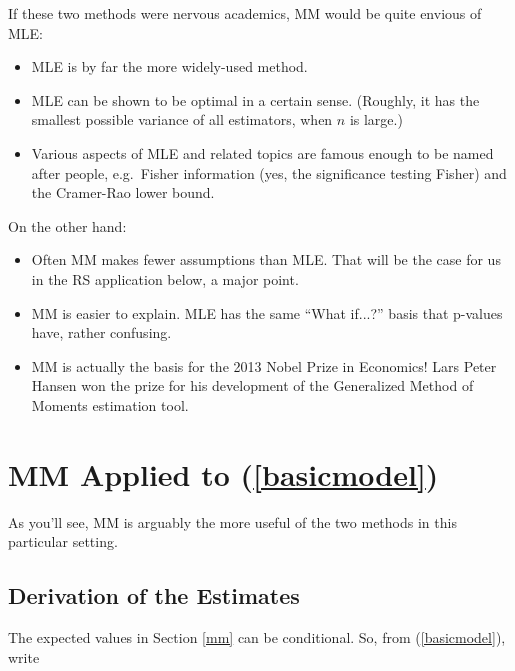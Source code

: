 If these two methods were nervous academics, MM would be quite envious
of MLE:

\begin{itemize}

\item MLE is by far the more widely-used method.

\item MLE can be shown to be optimal in a certain sense.  (Roughly, it
has the smallest possible variance of all estimators, when $n$ is
large.)

\item Various aspects of MLE and related topics are famous enough to be
named after people, e.g.\ Fisher information (yes, the significance
testing Fisher) and the Cramer-Rao lower bound.

\end{itemize} 

On the other hand:

\begin{itemize}

\item Often MM makes fewer assumptions than MLE.  That will be the case
for us in the RS application below, a major point.  

\item MM is easier to explain.  MLE has the same ``What if...?'' basis
that p-values have, rather confusing.

\item MM is actually the basis for the 2013 Nobel Prize in Economics!
Lars Peter Hansen won the prize for his development of the Generalized
Method of Moments estimation tool.

\end{itemize} 

\section{MM Applied to (\ref{basicmodel})} 

As you'll see, MM is arguably the more useful of the two methods in this
particular setting.

\subsection{Derivation of the Estimates}

The expected values in Section \ref{mm} can be conditional.  So, from
(\ref{basicmodel}), write

